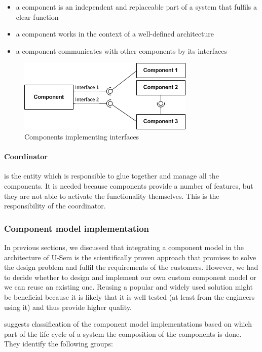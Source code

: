 \begin{itemize}
	\item a component is an independent and replaceable part of a system that fulfils a clear function
	\item a component works in the context of a well-defined architecture
	\item a component communicates with other components by its interfaces 
\end{itemize}

	\begin{figure}[h!]
  		\centering
  		\includegraphics[scale=0.75]{plug-in/component-services.png}
  		\caption{Components implementing interfaces }
  		\label{fig_comp}
	\end{figure}

\paragraph{Coordinator}
	is the entity which is responsible to glue together and manage all the components. It is needed because components provide a number of features, but they are not able to activate the functionality themselves. This is the responsibility of the coordinator.

\subsubsection{Component model implementation}

In previous sections, we discussed that integrating a component model in the architecture of U-Sem is the scientifically proven approach that promises to solve the design problem and fulfil the requirements of the customers. However, we had to decide whether to design and implement our own custom component model or we can reuse an existing one. Reusing a popular and widely used solution might be beneficial because it is likely that it is well tested (at least from the engineers using it) and thus provide higher quality. 

\cite{lau2007software} suggests classification of the component model implementations based on which part of the life cycle of a system the composition of the components is done. They identify the following groups:

